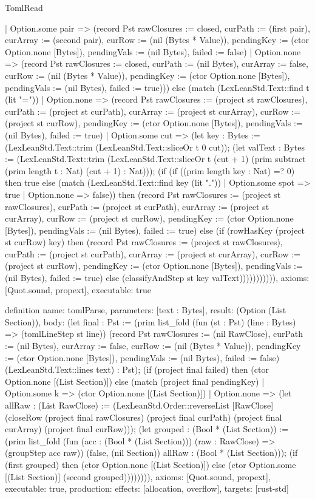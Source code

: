 \begin{lexlean}{TomlRead}
\begin{semanticmodule}
{      | Option.some pair => (record Pst {rawClosures := closed, curPath := (first pair), curArray := (second pair), curRow := (nil (Bytes * Value)), pendingKey := (ctor Option.none [Bytes]), pendingVals := (nil Bytes), failed := false})
      | Option.none => (record Pst {rawClosures := closed, curPath := (nil Bytes), curArray := false, curRow := (nil (Bytes * Value)), pendingKey := (ctor Option.none [Bytes]), pendingVals := (nil Bytes), failed := true}))) else (match (LexLeanStd.Text::find t (lit "="))
      | Option.none => (record Pst {rawClosures := (project st rawClosures), curPath := (project st curPath), curArray := (project st curArray), curRow := (project st curRow), pendingKey := (ctor Option.none [Bytes]), pendingVals := (nil Bytes), failed := true})
      | Option.some cut => (let key : Bytes := (LexLeanStd.Text::trim (LexLeanStd.Text::sliceOr t 0 cut)); (let valText : Bytes := (LexLeanStd.Text::trim (LexLeanStd.Text::sliceOr t (cut + 1) (prim subtract (prim length t : Nat) (cut + 1) : Nat))); (if (if ((prim length key : Nat) =? 0) then true else (match (LexLeanStd.Text::find key (lit "."))
        | Option.some spot => true
        | Option.none => false)) then (record Pst {rawClosures := (project st rawClosures), curPath := (project st curPath), curArray := (project st curArray), curRow := (project st curRow), pendingKey := (ctor Option.none [Bytes]), pendingVals := (nil Bytes), failed := true}) else (if (rowHasKey (project st curRow) key) then (record Pst {rawClosures := (project st rawClosures), curPath := (project st curPath), curArray := (project st curArray), curRow := (project st curRow), pendingKey := (ctor Option.none [Bytes]), pendingVals := (nil Bytes), failed := true}) else (classifyAndStep st key valText))))))))))),
  axioms: [Quot.sound, propext],
  executable: true
}

definition{
  name: tomlParse,
  parameters: [text : Bytes],
  result: (Option (List Section)),
  body: (let final : Pst := (prim list_fold (fun (st : Pst) (line : Bytes) => (tomlLineStep st line)) (record Pst {rawClosures := (nil RawClose), curPath := (nil Bytes), curArray := false, curRow := (nil (Bytes * Value)), pendingKey := (ctor Option.none [Bytes]), pendingVals := (nil Bytes), failed := false}) (LexLeanStd.Text::lines text) : Pst); (if (project final failed) then (ctor Option.none [(List Section)]) else (match (project final pendingKey)
    | Option.some k => (ctor Option.none [(List Section)])
    | Option.none => (let allRaw : (List RawClose) := (LexLeanStd.Order::reverseList [RawClose] (closeRow (project final rawClosures) (project final curPath) (project final curArray) (project final curRow))); (let grouped : (Bool * (List Section)) := (prim list_fold (fun (acc : (Bool * (List Section))) (raw : RawClose) => (groupStep acc raw)) (false, (nil Section)) allRaw : (Bool * (List Section))); (if (first grouped) then (ctor Option.none [(List Section)]) else (ctor Option.some [(List Section)] (second grouped)))))))),
  axioms: [Quot.sound, propext],
  executable: true,
  production: {effects: [allocation, overflow], targets: [rust-std]}
}


\end{semanticmodule}
\end{lexlean}
